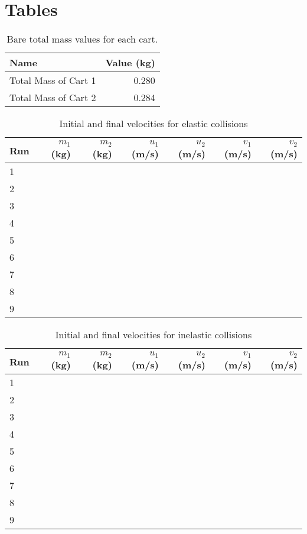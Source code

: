 \section{Tables}
\begin{table}[ht]
    \centering
    \begin{tabular}{|l|r|}
        \hline
        Name & Value (kg) \\
        \hline
        Total Mass of Cart 1 & 0.280 \\
        Total Mass of Cart 2 & 0.284 \\
        \hline
    \end{tabular}
    \caption{Bare total mass values for each cart.}
    \label{09:table.mass}
\end{table}
\begin{table}[ht]
    \centering
    \begin{tabular}{|l|r|r|r|r|r|r|}
        \hline
        Run & $m_{1}$ (kg) & $m_{2}$ (kg) & $u_{1}$ (m/s) & $u_{2}$ (m/s) & $v_{1}$ (m/s) & $v_{2}$ (m/s) \\
        \hline
        1 & & & & & & \\
        2 & & & & & & \\
        3 & & & & & & \\
        \hline
        4 & & & & & & \\
        5 & & & & & & \\
        6 & & & & & & \\
        \hline
        7 & & & & & & \\
        8 & & & & & & \\
        9 & & & & & & \\
        \hline
    \end{tabular}
    \caption{Initial and final velocities for elastic collisions}
    \label{09:table.v.elastic}
\end{table}
\begin{table}[ht]
    \centering
    \begin{tabular}{|l|r|r|r|r|r|r|}
        \hline
        Run & $m_{1}$ (kg) & $m_{2}$ (kg) & $u_{1}$ (m/s) & $u_{2}$ (m/s) & $v_{1}$ (m/s) & $v_{2}$ (m/s) \\
        \hline
        1 & & & & & & \\
        2 & & & & & & \\
        3 & & & & & & \\
        \hline
        4 & & & & & & \\
        5 & & & & & & \\
        6 & & & & & & \\
        \hline
        7 & & & & & & \\
        8 & & & & & & \\
        9 & & & & & & \\
        \hline
    \end{tabular}
    \caption{Initial and final velocities for inelastic collisions}
    \label{09:table.v.inelastic}
\end{table}
